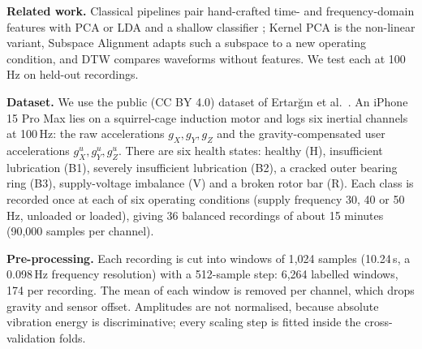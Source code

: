 \textbf{Related work.} Classical pipelines pair hand-crafted time- and frequency-domain features
with PCA or LDA and a shallow classifier \cite{duda2001}; Kernel PCA \cite{scholkopf1998} is the
non-linear variant, Subspace Alignment \cite{fernando2013} adapts such a subspace to a new
operating condition, and DTW \cite{sakoe1978} compares waveforms without features. We test each
at 100\,Hz on held-out recordings.

\textbf{Dataset.} We use the public (CC BY 4.0) dataset of Ertar{\u{g}}{\i}n et al.~\cite{ertargin2026}. An iPhone 15 Pro Max lies on
a squirrel-cage induction motor and logs six inertial channels at 100\,Hz: the raw accelerations
$g_X, g_Y, g_Z$ and the gravity-compensated user accelerations $g^u_X, g^u_Y, g^u_Z$. There are
six health states: healthy (H), insufficient lubrication (B1), severely insufficient lubrication
(B2), a cracked outer bearing ring (B3), supply-voltage imbalance (V) and a broken rotor bar (R).
Each class is recorded once at each of six operating conditions (supply frequency 30, 40 or
50\,Hz, unloaded or loaded), giving 36 balanced recordings of about 15 minutes (90{,}000 samples
per channel).

\textbf{Pre-processing.} Each recording is cut into windows of 1{,}024 samples (10.24\,s, a
0.098\,Hz frequency resolution) with a 512-sample step: 6{,}264 labelled windows, 174 per
recording. The mean of each window is removed per channel, which drops gravity and sensor
offset. Amplitudes are not normalised, because absolute vibration energy is discriminative;
every scaling step is fitted inside the cross-validation folds.
